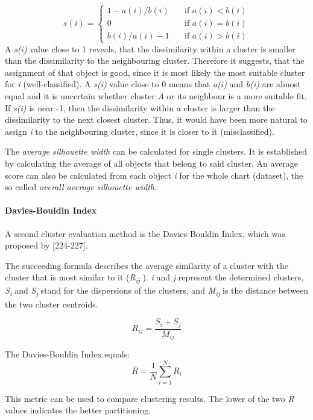 \[ s(i) =
\begin{cases}
  1 - a(i)/b(i)       & \quad \text{if } a(i) < b(i)\\
  0       & \quad \text{if } a(i) = b(i)\\
b(i)/a(i) - 1      & \quad \text{if } a(i) > b(i)

\end{cases}
\]
A \textit{s(i)} value close to 1 reveals, that the dissimilarity within a cluster is smaller than the dissimilarity to the neighbouring cluster. Therefore it suggests, that the assignment of that object is good, since it is most likely the most suitable cluster for \textit{i} (well-classified). A \textit{s(i)} value close to 0 means that \textit{a(i)} and \textit{b(i)} are almost equal and it is uncertain whether cluster \textit{A} or its neighbour is a more suitable fit. If \textit{s(i)} is near -1, then the dissimilarity within a cluster is larger than the dissimilarity to the next closest cluster. Thus, it would have been more natural to assign \textit{i} to the neighbouring cluster, since it is closer to it (misclassified).

The \textit{average silhouette width} can be calculated for single clusters. It is established by calculating the average of all objects that belong to said cluster. An average score can also be calculated from each object \textit{i} for the whole chart (dataset), the so called \textit{overall average silhouette width}. 


\paragraph{Davies-Bouldin Index}
A second cluster evaluation method is the Davies-Bouldin Index, which was proposed by \textcite{DaviesBouldin}[224-227]. 

The succeeding formula describes the average similarity of a cluster with the cluster that is most similar to it (\textit{R\textsubscript{ij}} ).
\textit{i} and \textit{j} represent the determined clusters, \textit{S\textsubscript{i}} and \textit{S\textsubscript{j}} stand for the dispersions of the clusters, and \textit{M\textsubscript{ij}} is the distance between the two cluster centroids. 

\[
R_{ij} = \frac{S_i + S_j}{M_{ij}}  
\]

The Davies-Bouldin Index equals:
\[
\overline{R} = \frac{1}{N}\sum_{i=1}^{N}R_i
\]

This metric can be used to compare clustering results. The lower of the two \textit{\=R} values indicates the better partitioning.


